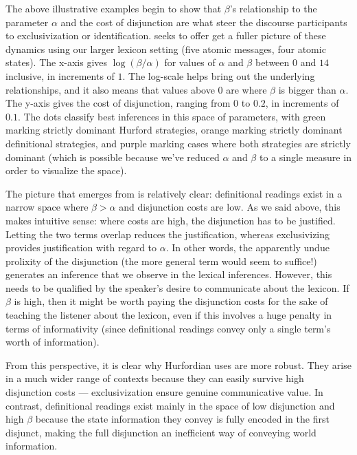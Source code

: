 \documentclass{article}
\begin{document}
The above illustrative examples begin to show that $\beta$'s
relationship to the parameter $\alpha$ and the cost of disjunction are
what steer the discourse participants to exclusivization or
identification.  seeks to offer get a fuller picture
of these dynamics using our larger lexicon setting (five atomic
messages, four atomic states). The x-axis gives $\log(\beta/\alpha)$
for values of $\alpha$ and $\beta$ between $0$ and $14$ inclusive, in
increments of $1$. The log-scale helps bring out the underlying
relationships, and it also means that values above $0$ are where
$\beta$ is bigger than $\alpha$. The y-axis gives the cost of
disjunction, ranging from $0$ to $0.2$, in increments of $0.1$. The
dots classify best inferences in this space of parameters, with green
marking strictly dominant Hurford strategies, orange marking strictly
dominant definitional strategies, and purple marking cases where both
strategies are strictly dominant (which is possible because we've
reduced $\alpha$ and $\beta$ to a single measure in order to visualize
the space).


The picture that emerges from  is relatively clear:
definitional readings exist in a narrow space where $\beta > \alpha$
and disjunction costs are low. As we said above, this makes intuitive
sense: where costs are high, the disjunction has to be
justified. Letting the two terms overlap reduces the justification,
whereas exclusivizing provides justification with regard to
$\alpha$. In other words, the apparently undue prolixity of the
disjunction (the more general term would seem to suffice!) generates
an inference that we observe in the lexical inferences. However, this
needs to be qualified by the speaker's desire to communicate about the
lexicon. If $\beta$ is high, then it might be worth paying the
disjunction costs for the sake of teaching the listener about the
lexicon, even if this involves a huge penalty in terms of
informativity (since definitional readings convey only a single term's
worth of information).

From this perspective, it is clear why Hurfordian uses are more
robust. They arise in a much wider range of contexts because they can
easily survive high disjunction costs --- exclusivization ensure
genuine communicative value. In contrast, definitional readings exist
mainly in the space of low disjunction and high $\beta$ because the
state information they convey is fully encoded in the first disjunct,
making the full disjunction an inefficient way of conveying world
information.
\end{document}
